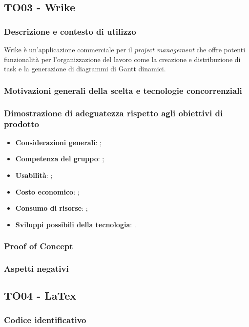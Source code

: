 \documentclass[./../Technology Baseline.tex]{subfiles}
\begin{document}
\subsection{TO03 - Wrike}

\subsubsection{Descrizione e contesto di utilizzo}
Wrike è un'applicazione commerciale per il \textit{project management} che offre potenti funzionalità per l'organizzazione del lavoro come la creazione e distribuzione di task e la generazione di diagrammi di Gantt dinamici.

\subsubsection{Motivazioni generali della scelta e tecnologie concorrenziali}
\subsubsection{Dimostrazione di adeguatezza rispetto agli obiettivi di prodotto}
\begin{itemize}
	\item \textbf{Considerazioni generali}: ;
	\item \textbf{Competenza del gruppo}: ;
	\item \textbf{Usabilità}: ;
	\item \textbf{Costo economico}: ;
	\item \textbf{Consumo di risorse}: ;
	\item \textbf{Sviluppi possibili della tecnologia}: .
\end{itemize}
\subsubsection{Proof of Concept}
\subsubsection{Aspetti negativi}

\subsection{TO04 - LaTex}

\subsubsection{Codice identificativo}
\end{document}

